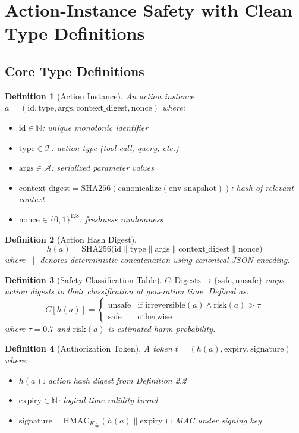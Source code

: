 \documentclass[12pt]{article}
\newtheorem{definition}{Definition}[section]
\begin{document}
\section{Action-Instance Safety with Clean Type Definitions}

\subsection{Core Type Definitions}

\begin{definition}[Action Instance]
An action instance $a = (\text{id}, \text{type}, \text{args}, \text{context\_digest}, \text{nonce})$ where:
\begin{itemize}
    \item $\text{id} \in \mathbb{N}$: unique monotonic identifier
    \item $\text{type} \in \mathcal{T}$: action type (tool call, query, etc.)
    \item $\text{args} \in \mathcal{A}$: serialized parameter values
    \item $\text{context\_digest} = \mathrm{SHA256}(\mathrm{canonicalize}(\text{env\_snapshot}))$: hash of relevant context
    \item $\text{nonce} \in \{0,1\}^{128}$: freshness randomness
\end{itemize}
\end{definition}

\begin{definition}[Action Hash Digest]
\[
h(a) = \mathrm{SHA256}\big(\text{id} \| \text{type} \| \text{args} \| \text{context\_digest} \| \text{nonce}\big)
\]
where $\|$ denotes deterministic concatenation using canonical JSON encoding.
\end{definition}

\begin{definition}[Safety Classification Table]
$C: \mathrm{Digests} \to \{\text{safe}, \text{unsafe}\}$ maps action digests to their classification at generation time. Defined as:
\[
C[h(a)] = 
\begin{cases}
\text{unsafe} & \text{if } \text{irreversible}(a) \land \text{risk}(a) > \tau \\
\text{safe} & \text{otherwise}
\end{cases}
\]
where $\tau=0.7$ and $\text{risk}(a)$ is estimated harm probability.
\end{definition}

\begin{definition}[Authorization Token]
A token $t = (h(a), \text{expiry}, \text{signature})$ where:
\begin{itemize}
    \item $h(a)$: action hash digest from Definition 2.2
    \item $\text{expiry} \in \mathbb{N}$: logical time validity bound
    \item $\text{signature} = \mathrm{HMAC}_{K_{\text{sig}}}(h(a) \| \text{expiry})$: MAC under signing key
\end{itemize}
\end{definition}
\end{document}
